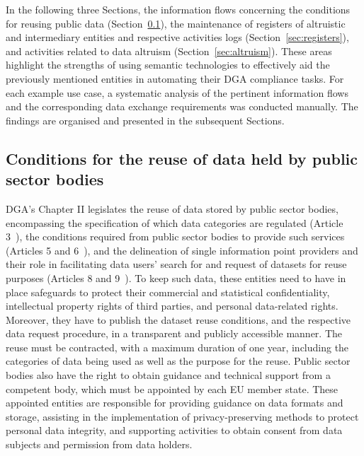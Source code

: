 In the following three Sections, the information flows concerning the conditions for reusing public data (Section~\ref{sec:reuse}), the maintenance of registers of altruistic and intermediary entities and respective activities logs (Section~\ref{sec:registers}), and activities related to data altruism (Section~\ref{sec:altruism}).
These areas highlight the strengths of using semantic technologies to effectively aid the previously mentioned entities in automating their DGA compliance tasks.
For each example use case, a systematic analysis of the pertinent information flows and the corresponding data exchange requirements was conducted manually.
The findings are organised and presented in the subsequent Sections.

\subsection{Conditions for the reuse of data held by public sector bodies}
\label{sec:reuse}

DGA's Chapter II legislates the reuse of data stored by public sector bodies, encompassing the specification of which data categories are regulated (Article 3~\citeyearpar{noauthor_regulation_2022}), the conditions required from public sector bodies to provide such services (Articles 5 and 6~\citeyearpar{noauthor_regulation_2022}), and the delineation of single information point providers and their role in facilitating data users' search for and request of datasets for reuse purposes (Articles 8 and 9~\citeyearpar{noauthor_regulation_2022}).
To keep such data, these entities need to have in place safeguards to protect their commercial and statistical confidentiality, intellectual property rights of third parties, and personal data-related rights.
Moreover, they have to publish the dataset reuse conditions, and the respective data request procedure, in a transparent and publicly accessible manner.
The reuse must be contracted, with a maximum duration of one year, including the categories of data being used as well as the purpose for the reuse. 
Public sector bodies also have the right to obtain guidance and technical support from a competent body, which must be appointed by each EU member state.
These appointed entities are responsible for providing guidance on data formats and storage, assisting in the implementation of privacy-preserving methods to protect personal data integrity, and supporting activities to obtain consent from data subjects and permission from data holders.

